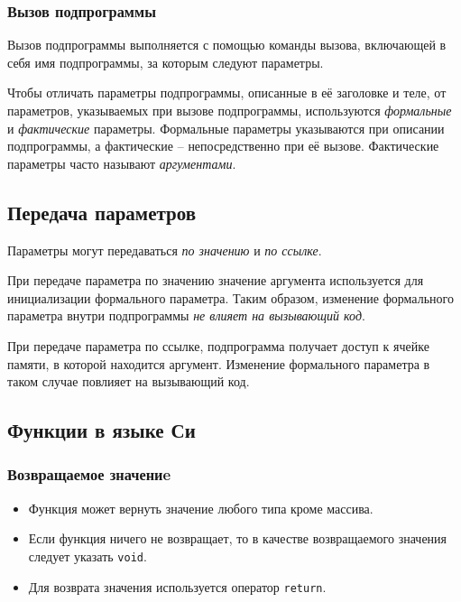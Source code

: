 \subsubsection{Вызов подпрограммы}

Вызов подпрограммы выполняется с помощью команды вызова, включающей в себя имя подпрограммы, за которым следуют параметры. 

Чтобы отличать параметры подпрограммы, описанные в её заголовке и теле, от параметров, указываемых при вызове подпрограммы, используются \textit{формальные} и \textit{фактические} параметры. Формальные параметры указываются при описании подпрограммы, а фактические – непосредственно при её вызове. Фактические параметры часто называют \textit{аргументами}.

\subsection{Передача параметров}

Параметры могут передаваться \textit{по значению} и \textit{по ссылке}.

При передаче параметра по значению значение аргумента используется для инициализации формального параметра. Таким образом, изменение формального параметра внутри подпрограммы \textit{не влияет на вызывающий код}.

При передаче параметра по ссылке, подпрограмма получает доступ к ячейке памяти, в которой находится аргумент. Изменение формального параметра в таком случае повлияет на вызывающий код.

\subsection{Функции в языке Си}

\subsubsection{Возвращаемое значениe}

\begin{itemize}
  \item Функция может вернуть значение любого типа кроме массива.
  \item Если функция ничего не возвращает, то в качестве возвращаемого значения следует указать \texttt{void}.
  \item Для возврата значения используется оператор \texttt{return}.
\end{itemize}

